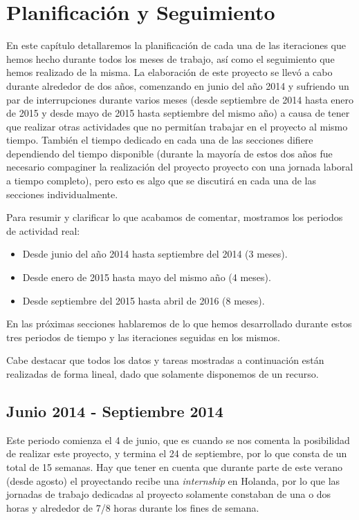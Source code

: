 \chapter{Planificación y Seguimiento}

En este capítulo detallaremos la planificación de cada una de las iteraciones que hemos hecho durante todos los meses de trabajo, así como el seguimiento que hemos realizado de la misma. La elaboración de este proyecto se llevó a cabo durante alrededor de dos años, comenzando en junio del año 2014 y sufriendo un par de interrupciones durante varios meses (desde septiembre de 2014 hasta enero de 2015 y desde mayo de 2015 hasta septiembre del mismo año) a causa de tener que realizar otras actividades que no permitían trabajar en el proyecto al mismo tiempo. También el tiempo dedicado en cada una de las secciones difiere dependiendo del tiempo disponible (durante la mayoría de estos dos años fue necesario compaginer la realización del proyecto proyecto con una jornada laboral a tiempo completo), pero esto es algo que se discutirá en cada una de las secciones individualmente.

Para resumir y clarificar lo que acabamos de comentar, mostramos los periodos de actividad real:

\begin{itemize}
  \item Desde junio del año 2014 hasta septiembre del 2014 (3 meses).
  \item Desde enero de 2015 hasta mayo del mismo año (4 meses).
  \item Desde septiembre del 2015 hasta abril de 2016 (8 meses).
\end{itemize}

\noindent En las próximas secciones hablaremos de lo que hemos desarrollado durante estos tres periodos de tiempo y las iteraciones seguidas en los mismos.

Cabe destacar que todos los datos y tareas mostradas a continuación están realizadas de forma lineal, dado que solamente disponemos de un recurso.

\section{Junio 2014 - Septiembre 2014}

Este periodo comienza el 4 de junio, que es cuando se nos comenta la posibilidad de realizar este proyecto, y termina el 24 de septiembre, por lo que consta de un total de 15 semanas. Hay que tener en cuenta que durante parte de este verano (desde agosto) el proyectando recibe una \textit{internship} en Holanda, por lo que las jornadas de trabajo dedicadas al proyecto solamente constaban de una o dos horas y alrededor de 7/8 horas durante los fines de semana.

